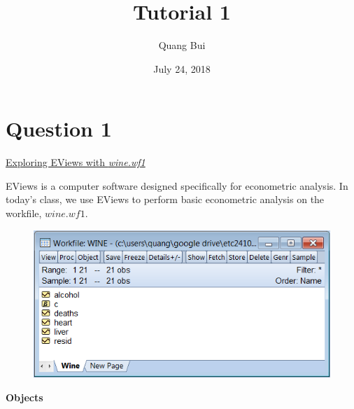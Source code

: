 \documentclass[12pt]{report}
\title{Tutorial 1}
\subtitle
{
	\textbf{keywords}: EViews, variables, data set, sample, population, descriptive analytics, summary statistics, histogram, scatter plots, correlation, simple linear regression model, predictive analytics
	
	\textbf{estimated reading time}: 19 minutes
}
\author{Quang Bui}
\date{July 24, 2018}
\begin{document}
	
	\maketitle

	\section*{Question 1}
	\underline{Exploring EViews with \textit{wine.wf1}}
	
	\noindent EViews is a computer software designed specifically for econometric analysis. In today's class, we use EViews to perform basic econometric analysis on the workfile, $wine.wf1$.
		\begin{figure}[H]
			\centering
			\includegraphics{ss1}
		\end{figure}
		\vspace{-\baselineskip}
		\noindent \textbf{Objects}
		
\end{document}
